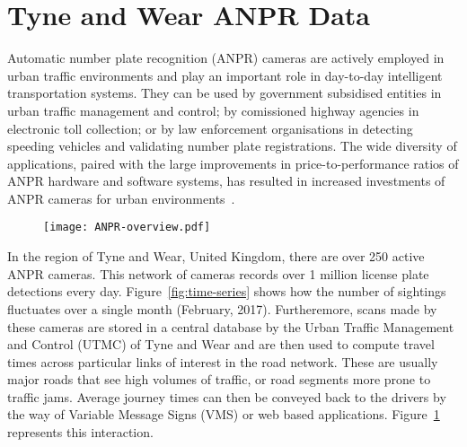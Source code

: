 \section{Tyne and Wear ANPR Data}\label{s.ncl}

Automatic number plate recognition (ANPR) cameras are actively employed in urban traffic environments and play an important role in day-to-day intelligent transportation systems. They can be used by government subsidised entities in urban traffic management and control; by comissioned highway agencies in electronic toll collection; or by law enforcement organisations in detecting speeding vehicles and validating number plate registrations. The wide diversity of applications, paired with the large improvements in price-to-performance ratios of ANPR hardware and software systems, has resulted in increased investments of ANPR cameras for urban environments~\cite{EvolutionUTMC2013, SurveyITS2011}.

\begin{figure}[t]
\centering
\texttt{[image: ANPR-overview.pdf]}
\caption{}
\label{fig:anpr-overview}
\end{figure}

In the region of Tyne and Wear, United Kingdom, there are over 250 active ANPR cameras. This network of cameras records over 1 million license plate detections every day. Figure~\ref{fig:time-series} shows how the number of sightings fluctuates over a single month (February, 2017). Furtheremore, scans made by these cameras are stored in a central database by the Urban Traffic Management and Control (UTMC) of Tyne and Wear and are then used to compute travel times across particular links of interest in the road network. These are usually major roads that see high volumes of traffic, or road segments more prone to traffic jams. Average journey times can then be conveyed back to the drivers by the way of Variable Message Signs (VMS) or web based applications. Figure~\ref{fig:anpr-overview} represents this interaction.


